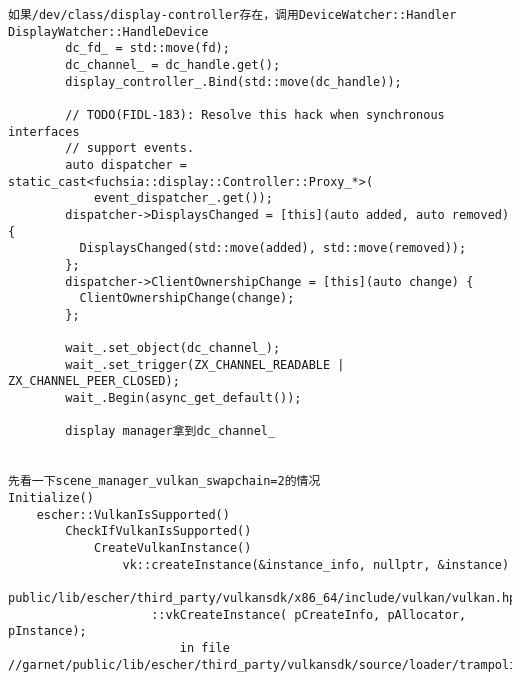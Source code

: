 \begin{verbatim}
如果/dev/class/display-controller存在，调用DeviceWatcher::Handler
DisplayWatcher::HandleDevice
        dc_fd_ = std::move(fd);
        dc_channel_ = dc_handle.get();
        display_controller_.Bind(std::move(dc_handle));

        // TODO(FIDL-183): Resolve this hack when synchronous interfaces
        // support events.
        auto dispatcher = static_cast<fuchsia::display::Controller::Proxy_*>(
            event_dispatcher_.get());
        dispatcher->DisplaysChanged = [this](auto added, auto removed) {
          DisplaysChanged(std::move(added), std::move(removed));
        };
        dispatcher->ClientOwnershipChange = [this](auto change) {
          ClientOwnershipChange(change);
        };

        wait_.set_object(dc_channel_);
        wait_.set_trigger(ZX_CHANNEL_READABLE | ZX_CHANNEL_PEER_CLOSED);
        wait_.Begin(async_get_default());

        display manager拿到dc_channel_


先看一下scene_manager_vulkan_swapchain=2的情况
Initialize()
    escher::VulkanIsSupported()
        CheckIfVulkanIsSupported()
            CreateVulkanInstance()
                vk::createInstance(&instance_info, nullptr, &instance)
                    public/lib/escher/third_party/vulkansdk/x86_64/include/vulkan/vulkan.hpp
                    ::vkCreateInstance( pCreateInfo, pAllocator, pInstance);
                        in file //garnet/public/lib/escher/third_party/vulkansdk/source/loader/trampoline.c




\end{verbatim}